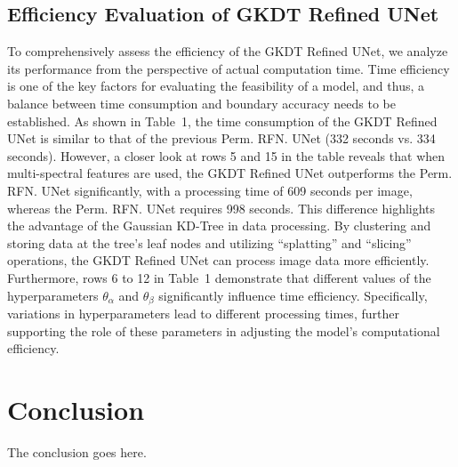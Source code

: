 \documentclass[journal]{IEEEtran}
\begin{document}
\subsection{Efficiency Evaluation of GKDT Refined UNet}
\label{subsec:efficiency}
To comprehensively assess the efficiency of the GKDT Refined UNet, we analyze its performance from the perspective of actual computation time. Time efficiency is one of the key factors for evaluating the feasibility of a model, and thus, a balance between time consumption and boundary accuracy needs to be established. As shown in Table~1, the time consumption of the GKDT Refined UNet is similar to that of the previous Perm. RFN. UNet (332 seconds vs. 334 seconds). However, a closer look at rows 5 and 15 in the table reveals that when multi-spectral features are used, the GKDT Refined UNet outperforms the Perm. RFN. UNet significantly, with a processing time of 609 seconds per image, whereas the Perm. RFN. UNet requires 998 seconds. This difference highlights the advantage of the Gaussian KD-Tree in data processing. By clustering and storing data at the tree's leaf nodes and utilizing ``splatting'' and ``slicing'' operations, the GKDT Refined UNet can process image data more efficiently. Furthermore, rows 6 to 12 in Table~1 demonstrate that different values of the hyperparameters $\theta_\alpha$ and $\theta_\beta$ significantly influence time efficiency. Specifically, variations in hyperparameters lead to different processing times, further supporting the role of these parameters in adjusting the model’s computational efficiency.

\section{Conclusion}
\label{sec:conclusion}
The conclusion goes here.






%
\end{document}
